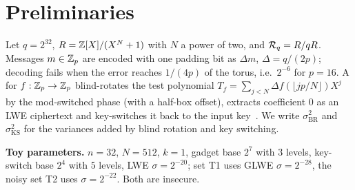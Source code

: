 \section{Preliminaries}\label{sec:prelim}
Let $q=2^{32}$, $R=\mathbb{Z}[X]/(X^N+1)$ with $N$ a power of two, and $\mathcal{R}_q=R/qR$. Messages %
$m\in\mathbb{Z}_p$ are encoded with one padding bit as $\Delta m$, $\Delta=q/(2p)$; decoding fails
when the error reaches $1/(4p)$ of the torus, i.e.\ $2^{-6}$ for $p=16$. A \PBSop{} for
$f:\mathbb{Z}_p\to\mathbb{Z}_p$ blind-rotates the test polynomial
$T_f=\sum_{j<N}\Delta f(\lfloor jp/N\rfloor)X^j$ by the mod-switched phase (with a half-box
offset), extracts coefficient $0$ as an LWE ciphertext and key-switches it back to the input
key~\cite{CGGI20,CJP21}. We write $\sigma^2_{\mathrm{BR}}$ and $\sigma^2_{\mathrm{KS}}$ for the
variances added by blind rotation and key switching.

\noindent\textbf{Toy parameters.} $n=32$, $N=512$, $k=1$, gadget base $2^7$ with $3$ levels,
key-switch base $2^4$ with $5$ levels, LWE $\sigma=2^{-20}$; set T1 uses GLWE
$\sigma=2^{-28}$, the noisy set T2 uses $\sigma=2^{-22}$. Both are insecure.
